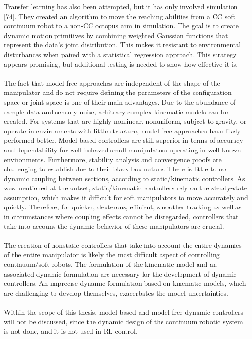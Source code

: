 \documentclass[12pt,twoside,a4]{mwbk}
\begin{document}
\noindent Transfer learning has also been attempted, but it has only involved simulation [74]. They created an algorithm to move the reaching abilities from a CC soft continuum robot to a non-CC octopus arm in simulation. The goal is to create dynamic motion primitives by combining weighted Gaussian functions that represent the data's joint distribution. This makes it resistant to environmental disturbances when paired with a statistical regression approach. This strategy appears promising, but additional testing is needed to show how effective it is. 
\\ \\
The fact that model-free approaches are independent of the shape of the manipulator and do not require defining the parameters of the configuration space or joint space is one of their main advantages. Due to the abundance of sample data and sensory noise, arbitrary complex kinematic models can be created. For systems that are highly nonlinear, nonuniform, subject to gravity, or operate in environments with little structure, model-free approaches have likely performed better. Model-based controllers are still superior in terms of accuracy and dependability for well-behaved small manipulators operating in well-known environments. Furthermore, stability analysis and convergence proofs are challenging to establish due to their black box nature. There is little to no dynamic coupling between sections, according to static/kinematic controllers. As was mentioned at the outset, static/kinematic controllers rely on the steady-state assumption, which makes it difficult for soft manipulators to move accurately and quickly. Therefore, for quicker, dexterous, efficient, smoother tracking as well as in circumstances where coupling effects cannot be disregarded, controllers that take into account the dynamic behavior of these manipulators are crucial.
\\ \\
The creation of nonstatic controllers that take into account the entire dynamics of the entire manipulator is likely the most difficult aspect of controlling continuum/soft robots. The formulation of the kinematic model and an associated dynamic formulation are necessary for the development of dynamic controllers. An imprecise dynamic formulation based on kinematic models, which are challenging to develop themselves, exacerbates the model uncertainties. 
\\ \\
Within the scope of this thesis, model-based and model-free dynamic controllers will not be discussed, since the dynamic design of the continuum robotic system is not done, and it is not used in RL control.
\end{document}
